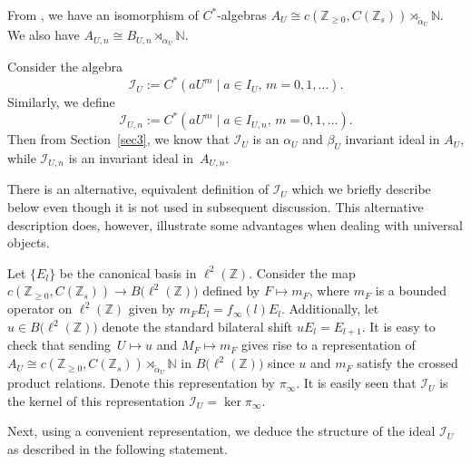 \documentclass[10pt,a4paper]{amsart}
\newcommand{\N}{{\mathbb N}}
\newcommand{\Z}{{\mathbb Z}}
\numberwithin{equation}{section}
\begin{document}
From \cite[Theorem 4.4]{HKMP3}, we have an isomorphism of $C^*$-algebras
$A_U \cong c(\Z_{\ge0}, C(\Z_s))\rtimes_{\tilde{\alpha}_U}\N$.
We also have
$A_{U,n} \cong B_{U,n}\rtimes_{\alpha_U} \N$.

Consider the algebra
\[\mathcal{I}_U := C^*(aU^m \mid a\in I_U,\, m=0,1,\dots).\]
Similarly, we define
\[\mathcal{I}_{U,n} := C^*(aU^m \mid a\in I_{U,n},\, m=0,1,\dots).\]
Then from Section~\ref{sec3}, we know that $\mathcal{I}_U$ is an $\alpha_U$ and $\beta_U$ invariant ideal in $A_U$, while $\mathcal{I}_{U,n}$ is an invariant ideal in~$A_{U,n}$.

There is an alternative, equivalent definition of $\mathcal{I}_U$ which we briefly describe below even though it is not used in subsequent discussion. This alternative description does, however, illustrate some advantages when dealing with universal objects.

Let $\{E_l\}$ be the canonical basis in $\ell^2(\Z)$. Consider the map $c(\Z_{\ge0}, C(\Z_s)) \to B\bigl(\ell^2(\Z)\bigr)$ defined by $F \mapsto m_F$, where $m_F$ is a bounded operator on $\ell^2(\Z)$ given by
$
m_F E_l = f_\infty(l) E_l$.
Additionally, let $u \in B\bigl(\ell^2(\Z)\bigr)$ denote the standard bilateral shift
$
uE_l = E_{l+1}$.
It is easy to check that sending~${U \mapsto u}$ and $M_F \mapsto m_F$ gives rise to a representation of $A_U \cong c(\Z_{\ge0}, C(\Z_s))\rtimes_{\tilde{\alpha}_U}\N$ in $B\bigl(\ell^2(\Z)\bigr)$ since $u$ and $m_F$ satisfy the crossed product relations. Denote this representation by $\pi_\infty$.
It is easily seen that $\mathcal{I}_U$ is the kernel of this representation
$
\mathcal{I}_U = \ker \pi_\infty$.

Next, using a convenient representation, we deduce the structure of the ideal $\mathcal{I}_U$ as described in the following statement.
\end{document}
